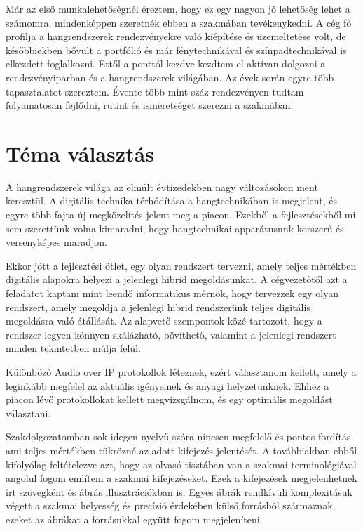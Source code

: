 Már az első munkalehetőségnél éreztem, hogy ez egy nagyon jó lehetőség lehet a számomra, mindenképpen szeretnék ebben a szakmában tevékenykedni.
A cég fő profilja a hangrendszerek rendezvényekre való kiépítése és üzemeltetése volt, de későbbiekben bővült a portfólió és már fénytechnikával és színpadtechnikával is elkezdett foglalkozni. 
Ettől a ponttól kezdve kezdtem el aktívan dolgozni a rendezvényiparban és a hangrendszerek világában. Az évek során egyre több tapasztalatot szereztem.
Évente több mint száz rendezvényen tudtam folyamatosan fejlődni, rutint és ismeretséget szerezni a szakmában.
\section{Téma választás}
A hangrendszerek világa az elmúlt évtizedekben nagy változásokon ment keresztül.
A digitális technika térhódítása a hangtechnikában is megjelent, és egyre több fajta új megközelítés jelent meg a piacon.
Ezekből a fejlesztésekből mi sem szerettünk volna kimaradni, hogy hangtechnikai apparátusunk korszerű és versenyképes maradjon.

Ekkor jött a fejlesztési ötlet, egy olyan rendszert tervezni, amely teljes mértékben digitális alapokra helyezi a jelenlegi hibrid megoldásunkat.
A cégvezetőtől azt a feladatot kaptam mint leendő informatikus mérnök, hogy tervezzek egy olyan rendszert,
amely megoldja a jelenlegi hibrid rendszerünk teljes digitális megoldásra való átállását.
Az alapvető szempontok közé tartozott, hogy a rendszer legyen könnyen skálázható, bővíthető, valamint a jelenlegi rendszert minden tekintetben múlja felül.

Különböző Audio over IP protokollok léteznek, ezért választanom kellett, amely a leginkább megfelel az aktuális igényeinek és anyagi helyzetünknek.
Ehhez a piacon lévő protokollokat kellett megvizsgálnom, és egy optimális megoldást választani.

Szakdolgozatomban sok idegen nyelvű szóra nincsen megfelelő és pontos fordítás ami teljes mértékben tükrözné az adott kifejezés jelentését.
A továbbiakban ebből kifolyólag feltételezve azt, hogy az olvasó tisztában van a szakmai terminológiával angolul fogom említeni a szakmai kifejezéseket.
Ezek a kifejezések megjelenhetnek írt szövegként és ábrás illusztrációkban is. Egyes ábrák rendkívüli komplexitásuk végett a szakmai helyesség és precízió érdekében
külső forrásból származnak, ezeket az ábrákat a forrásukkal együtt fogom megjeleníteni.
